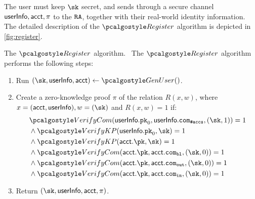 The user must keep $\sk$ secret, and sends through a secure channel $\textup{\textsf{userInfo}}, \textup{\textsf{acct}}, \pi$ to the $\textup{\texttt{{RA}}}$, together with their real-world identity information.
The detailed description of the $\reg$ algorithm is depicted in \autoref{fig:register}.

\begin{boxfig}{\label{fig:register}{The $\reg$ algorithm.}}%
\ The $\reg$ algorithm performs the following steps: 
\begin{enumerate}
    \item Run $(\sk, \userinfo, \acct) \gets \genuser()$. 
    \item Create a zero-knowledge proof $\pi$ of the relation $R(x,w)$, where \ $x = (\acct, \userinfo), w = (\sk)$ and $R(x,w) = 1$ if:
    {\begin{align*} 
        & \vercom(\userinfo.\inpk, \userinfo.\com_{\numaccs}, (\sk, 1)) = 1 \\
        & \wedge \verkp(\userinfo.\inpk, \sk)=1 \\
        & \wedge \verkp(\acct.\pk, \sk) = 1 \\
        & \wedge \vercom(\acct.\pk, \acct.\com_\varbl, (\sk, 0)) = 1 \\
        & \wedge \vercom(\acct.\pk, \acct.\com_{\varout}, (\sk, 0)) = 1 \\
        & \wedge \vercom(\acct.\pk, \acct.\com_{\varin}, (\sk, 0)) = 1 \\
    \end{align*}}

    \item Return $(\sk, \userinfo, \acct, \pi)$.
\end{enumerate}
\end{boxfig}


